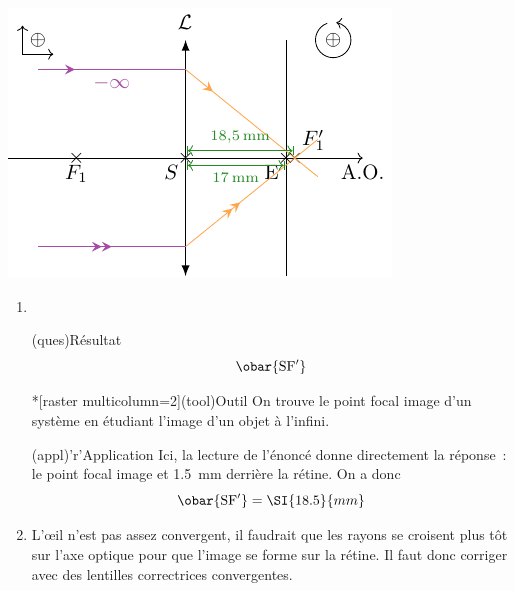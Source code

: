 \documentclass[../../main/main.tex]{subfiles}
\begin{document}
{\begin{center}
\begin{tcb}[sidebyside]
\begin{center}
				\includegraphics{oeil_hyper-data.pdf}
			\end{center}
		\end{tcb}
	\end{center}

	\begin{enumerate}
		\item ~
		      \begin{tcbraster}[raster columns=5, raster equal height=rows]
			      \begin{tcb}(ques){Résultat}
				      \[\obar{\rm SF'}\]
			      \end{tcb}
			      \begin{tcb}*[raster multicolumn=2](tool){Outil}
				      On trouve le point focal image d'un système en étudiant l'image d'un
				      objet à l'infini.
			      \end{tcb}
			      \begin{tcb}[raster multicolumn=2](appl)'r'{Application}
				      Ici, la lecture de l'énoncé donne directement la réponse~: le
				      point focal image et \SI{1.5}{mm} derrière la rétine. On a donc
				      \[\obar{\rm SF'} = \SI{18.5}{mm}\]
			      \end{tcb}
		      \end{tcbraster}
		\item L'œil n'est pas assez convergent, il faudrait que les rayons se
		      croisent plus tôt sur l'axe optique pour que l'image se forme sur la
		      rétine. Il faut donc corriger avec des lentilles correctrices
		      convergentes.


\end{enumerate}}
\end{document}
